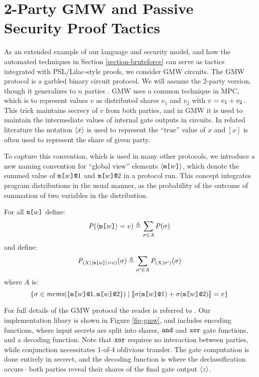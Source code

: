 \section{2-Party GMW and Passive Security Proof Tactics}
\label{section-metalang-gmw}
\label{section-example-gmw}



As an extended example of our language and security model, and how the
automated techniques in Section \ref{section-bruteforce} can serve
as tactics integrated with PSL/Lilac-style proofs, we consider GMW
circuits.  The GMW protocol is a garbled binary circuit protocol.  We
will assume the 2-party version, though it generalizes to $n$
parties \cite{goldreich2019play}. GMW uses a common technique in MPC, which is to
represent values $v$ as distributed shares $v_1$ and $v_2$ with $v =
v_1 + v_2$. This trick maintains secrecy of $v$ from both
parties, and in GMW it is used to maintain the intermediate values of
internal gate outputs in circuits. In related literature the notation
$\langle x \rangle$ is used to represent the ``true'' value of $x$ and $[x]$
is often used to represent the share of given party.

To capture this convention, which is used in many other protocols, we
introduce a new naming convention for ``global view'' elements
$\langle \texttt{m[}w\texttt{]} \rangle$, which denote the summed value of
$\texttt{m[}w\texttt{]}\texttt{@}1$ and $\texttt{m[}w\texttt{]}\texttt{@}2$ in a protocol
run. This concept integrates program distributions in the
usual manner, as the probability of the outcome of summation
of two variables in the distribution.
\begin{definition}
  For all $\texttt{m[}w\texttt{]}$ define:
  $$\mathit{P}(\langle \texttt{m[}w\texttt{]} \rangle = v) \triangleq \sum_{\sigma \in A} \mathit{P}(\sigma)$$
  and define:
  $$\mathit{P}_{({X}|{\langle \texttt{m[}w\texttt{]} \rangle = v})}(\sigma) \triangleq  \sum_{\sigma' \in A} \mathit{P}_{({X}|{\sigma'})}(\sigma)$$
  where $A$ is:
  $$\{ \sigma \in \mathit{mems}(\{ \texttt{m[}w\texttt{]}\texttt{@}1,\texttt{m[}w\texttt{]}\texttt{@}2 \} ) \mid
      \llbracket \sigma(\texttt{m[}w\texttt{]}\texttt{@}1) + \sigma(\texttt{m[}w\texttt{]}\texttt{@}2) \rrbracket_{} = v \}$$
\end{definition}

For full details of the GMW protocol the reader is referred to
\cite{evans2018pragmatic}. Our implementation libary is shown in
Figure \ref{fig-gmw}, and includes encoding functions, where
input secrets are split into shares, $\texttt{and}$ and $\texttt{xor}$ gate
functions, and a decoding function. Note that $\texttt{xor}$ requires
no interaction between parties, while conjunction necessitates
1-of-4 oblivious transfer. The gate computation is
done entirely in secrect, and the decoding function
is where the declassification occurs-- both parties reveal
their shares of the final gate output $\langle z \rangle$.

